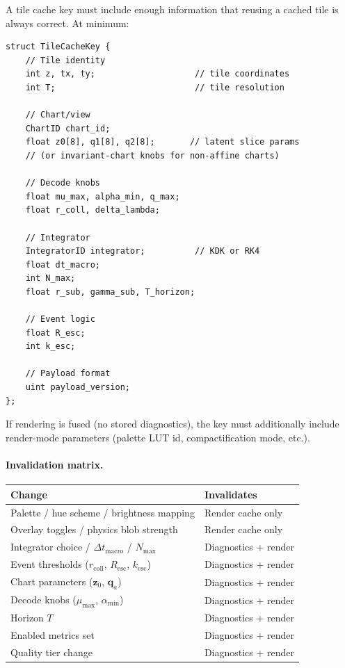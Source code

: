 \documentclass[11pt]{report}
\begin{document}
A tile cache key must include enough information that reusing a cached tile is always correct. At minimum:

\begin{verbatim}
struct TileCacheKey {
    // Tile identity
    int z, tx, ty;                    // tile coordinates
    int T;                            // tile resolution

    // Chart/view
    ChartID chart_id;
    float z0[8], q1[8], q2[8];       // latent slice params
    // (or invariant-chart knobs for non-affine charts)

    // Decode knobs
    float mu_max, alpha_min, q_max;
    float r_coll, delta_lambda;

    // Integrator
    IntegratorID integrator;          // KDK or RK4
    float dt_macro;
    int N_max;
    float r_sub, gamma_sub, T_horizon;

    // Event logic
    float R_esc;
    int k_esc;

    // Payload format
    uint payload_version;
};
\end{verbatim}

If rendering is fused (no stored diagnostics), the key must additionally include render-mode parameters (palette LUT id, compactification mode, etc.).

\paragraph{Invalidation matrix.}
\begin{center}
\begin{tabular}{ll}
\toprule
Change & Invalidates \\
\midrule
Palette / hue scheme / brightness mapping & Render cache only \\
Overlay toggles / physics blob strength & Render cache only \\
Integrator choice / $\Delta t_{\mathrm{macro}}$ / $N_{\max}$ & Diagnostics + render \\
Event thresholds ($r_{\mathrm{coll}}$, $R_{\mathrm{esc}}$, $k_{\mathrm{esc}}$) & Diagnostics + render \\
Chart parameters ($\mathbf z_0$, $\mathbf q_a$) & Diagnostics + render \\
Decode knobs ($\mu_{\max}$, $\alpha_{\min}$) & Diagnostics + render \\
Horizon $T$ & Diagnostics + render \\
Enabled metrics set & Diagnostics + render \\
Quality tier change & Diagnostics + render \\
\bottomrule
\end{tabular}
\end{center}
\end{document}

